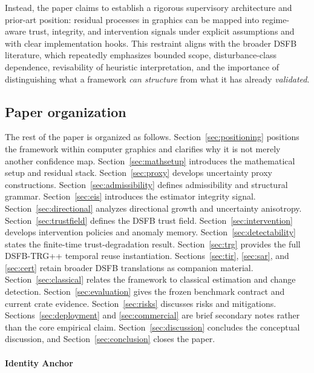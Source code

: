 \documentclass[11pt,letterpaper]{article}
\theoremstyle{gcresult}
\theoremstyle{definition}
\begin{document}
Instead, the paper claims to establish a rigorous supervisory architecture and prior-art position: residual processes in graphics can be mapped into regime-aware trust, integrity, and intervention signals under explicit assumptions and with clear implementation hooks. This restraint aligns with the broader DSFB literature, which repeatedly emphasizes bounded scope, disturbance-class dependence, revisability of heuristic interpretation, and the importance of distinguishing what a framework \emph{can structure} from what it has already \emph{validated}. 


\subsection{Paper organization}

The rest of the paper is organized as follows. Section~\ref{sec:positioning} positions the framework within computer graphics and clarifies why it is not merely another confidence map. Section~\ref{sec:mathsetup} introduces the mathematical setup and residual stack. Section~\ref{sec:proxy} develops uncertainty proxy constructions. Section~\ref{sec:admissibility} defines admissibility and structural grammar. Section~\ref{sec:eis} introduces the estimator integrity signal. Section~\ref{sec:directional} analyzes directional growth and uncertainty anisotropy. Section~\ref{sec:trustfield} defines the DSFB trust field. Section~\ref{sec:intervention} develops intervention policies and anomaly memory. Section~\ref{sec:detectability} states the finite-time trust-degradation result. Section~\ref{sec:trg} provides the full DSFB-TRG++ temporal reuse instantiation. Sections~\ref{sec:tir}, \ref{sec:sar}, and \ref{sec:cert} retain broader DSFB translations as companion material. Section~\ref{sec:classical} relates the framework to classical estimation and change detection. Section~\ref{sec:evaluation} gives the frozen benchmark contract and current crate evidence. Section~\ref{sec:risks} discusses risks and mitigations. Sections~\ref{sec:deployment} and \ref{sec:commercial} are brief secondary notes rather than the core empirical claim. Section~\ref{sec:discussion} concludes the conceptual discussion, and Section~\ref{sec:conclusion} closes the paper.


\paragraph{Identity Anchor}
\end{document}
